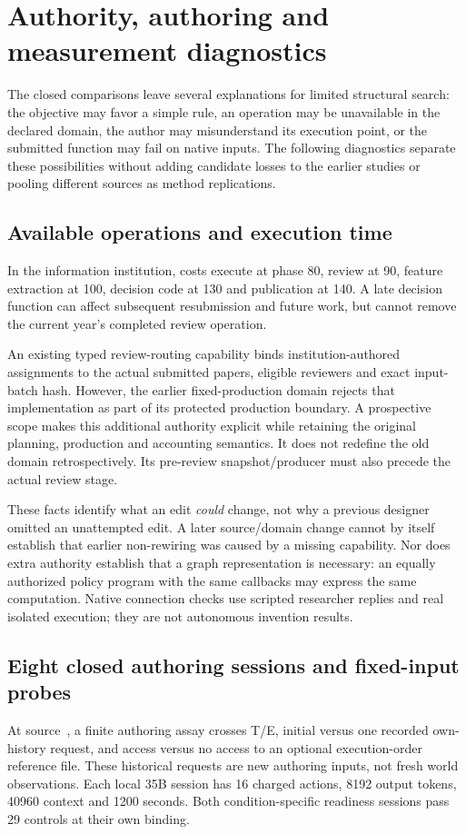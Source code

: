 \section{Authority, authoring and measurement diagnostics}
\label{sec:design-diagnostics}
The closed comparisons leave several explanations for limited structural
search: the objective may favor a simple rule, an operation may be unavailable
in the declared domain, the author may misunderstand its execution point,
or the submitted function may fail on native inputs. The following diagnostics
separate these possibilities without adding candidate losses to the earlier
studies or pooling different sources as method replications.

\subsection{Available operations and execution time}
In the information institution, costs execute at phase 80, review at 90,
feature extraction at 100, decision code at 130 and publication at 140.
A late decision function can affect subsequent resubmission and future work,
but cannot remove the current year's completed review operation.

An existing typed review-routing capability binds institution-authored
assignments to the actual submitted papers, eligible reviewers and exact
input-batch hash. However, the earlier fixed-production domain rejects that
implementation as part of its protected production boundary. A prospective
 scope makes this additional
authority explicit while retaining the original planning, production and
accounting semantics. It does not redefine the old domain retrospectively.
Its pre-review snapshot/producer must also precede the actual review stage.

These facts identify what an edit \emph{could} change, not why a previous
designer omitted an unattempted edit. A later source/domain change cannot by
itself establish that earlier non-rewiring was caused by a missing capability.
Nor does extra authority establish that a graph representation is necessary:
an equally authorized policy program with the same callbacks may express the
same computation. Native connection checks use scripted researcher replies
and real isolated execution; they are not autonomous invention results.

\subsection{Eight closed authoring sessions and fixed-input probes}
At source~, a finite authoring assay crosses T/E, initial versus
one recorded own-history request, and access versus no access to an optional
execution-order reference file. These historical requests are new authoring
inputs, not fresh world observations. Each local 35B session has 16 charged
actions, 8192 output tokens, 40960 context and 1200 seconds. Both condition-specific
readiness sessions pass 29 controls at their own binding.

